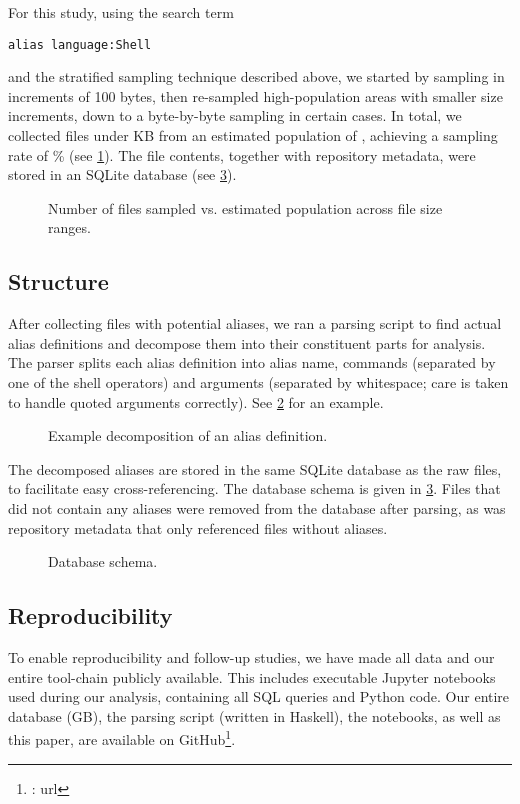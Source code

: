For this study, using the search term
\begin{verbatim}
alias language:Shell
\end{verbatim}
and the stratified sampling technique described above, we started by sampling in increments of 100 bytes, then re-sampled high-population areas with smaller size increments, down to a byte-by-byte sampling in certain cases.
In total, we collected \TODO files under \TODO KB from an estimated population of \TODO, achieving a sampling rate of \TODO\% (see \cref{fig:sampling}).
The file contents, together with repository metadata, were stored in an SQLite database (see \cref{fig:schema}).

\begin{figure}
    \centering
    \TODO
    \caption{Number of files sampled vs. estimated population across file size ranges.}
    \label{fig:sampling}
\end{figure}


\subsection{Structure}

After collecting files with potential aliases, we ran a parsing script to find actual alias definitions and decompose them into their constituent parts for analysis.
The parser splits each alias definition into alias name, commands (separated by one of the shell operators) and arguments (separated by whitespace; care is taken to handle quoted arguments correctly).
See \cref{fig:parser} for an example.

\begin{figure}
    \centering
    \TODO
    \caption{Example decomposition of an alias definition.}
    \label{fig:parser}
\end{figure}

The decomposed aliases are stored in the same SQLite database as the raw files, to facilitate easy cross-referencing.
The database schema is given in \cref{fig:schema}.
Files that did not contain any aliases were removed from the database after parsing, as was repository metadata that only referenced files without aliases.

\begin{figure}
    \centering
    \TODO
    \caption{Database schema.}
    \label{fig:schema}
\end{figure}

\subsection{Reproducibility}

To enable reproducibility and follow-up studies, we have made all data and our entire tool-chain publicly available.
This includes executable Jupyter notebooks used during our analysis, containing all SQL queries and Python code.
Our entire database (\TODO GB), the parsing script (written in Haskell), the notebooks, as well as this paper, are available on GitHub\footnote{\TODO: url}.

